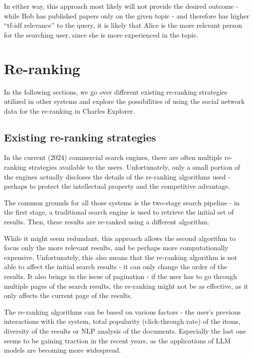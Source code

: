 In either way, this approach most likely will not provide the desired outcome - while Bob has published papers only on the given topic - and therefore has higher ``tf-idf relevance'' to the query,
it is likely that Alice is the more relevant person for the searching user, since she is more experienced in the topic.

\section{Re-ranking}

In the following sections, we go over different existing re-ranking strategies utilized in other systems and explore the possibilities of using the social network data for the re-ranking in Charles Explorer.

\subsection{Existing re-ranking strategies}

In the current (2024) commercial search engines, there are often multiple re-ranking strategies available to the users.
Unfortunately, only a small portion of the engines actually discloses the details of the re-ranking algorithms used - perhaps to protect the intellectual property and the competitive advantage.

The common grounds for all those systems is the two-stage search pipeline - in the first stage, a traditional search engine is used to retrieve the initial set of results.
Then, these results are re-ranked using a different algorithm. 

While it might seem redundant, this approach allows the second algorithm to focus only the more relevant results, and be perhaps more computationally expensive.
Unfortunately, this also means that the re-ranking algorithm is not able to affect the initial search results - it can only change the order of the results.
It also brings in the issue of pagination - if the user has to go through multiple pages of the search results, the re-ranking might not be as effective,
as it only affects the current page of the results.

The re-ranking algorithms can be based on various factors - the user's previous interactions with the system, total popularity (click-through rate) of the items,
diversity of the results %
or NLP analysis of the documents. Especially the last one seems to be gaining traction in the recent years, as the applications of LLM models are becoming more widespread.

